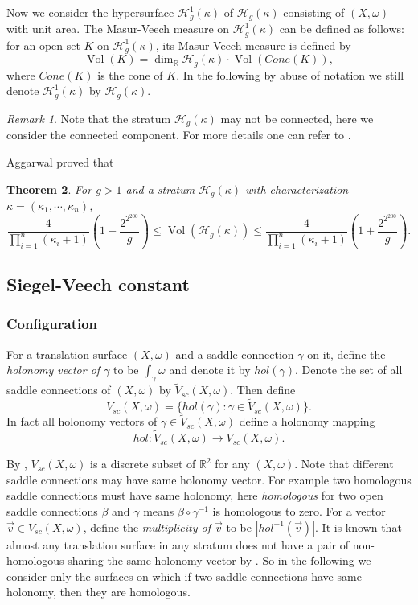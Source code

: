 \documentclass[12pt]{amsart} %
\newtheorem{theorem}{Theorem}[section]
\theoremstyle{definition}
\theoremstyle{remark}
\newtheorem{remark}[theorem]{Remark}
\numberwithin{equation}{section}
\renewcommand\H{{\mathcal H}}
\newcommand{\V}{\operatorname{Vol}}
\begin{document}
Now we consider the hypersurface $\H^1_g(\kappa)$ of $\H_g(\kappa)$ consisting of $(X,\omega)$ with unit area.
The Masur-Veech measure on $\H^1_g(\kappa)$ can be defined as follows:
for an open set $K$ on $\H^1_g(\kappa)$, its Masur-Veech measure is defined by  
$$\V(K)=\operatorname{dim}_{\mathbb{R}}\H_g(\kappa)\cdot \V(Cone(K)),$$
where $Cone(K)$ is the cone of $K$. 
In the following by abuse of notation we still denote $\H^1_g(\kappa)$ by $\H_g(\kappa)$.

\begin{remark}
Note that the stratum $\H_g(\kappa)$ may not be connected, here we consider the connected component. For more details one can refer to \cite{kontsevich2003connected}.
\end{remark}

Aggarwal \cite[Theorem 1.4]{aggarwal2020large} proved that
\begin{theorem}\label{Volume}
For $g>1$ and a stratum $\H_g(\kappa)$ with characterization $\kappa=(\kappa_1,\cdots,\kappa_n)$, 
$$\frac{4}{\prod_{i=1}^n(\kappa_i+1)}\left(1-\frac{2^{2^{200}}}{g} \right)\leq \V(\H_g(\kappa))
\leq \frac{4}{\prod_{i=1}^n(\kappa_i+1)}\left(1+\frac{2^{2^{200}}}{g} \right).$$
\end{theorem}
\subsection{Siegel-Veech constant}
\subsubsection{Configuration}
For a translation surface $(X,\omega)$ and a saddle connection $\gamma$ on it, define the \emph{holonomy vector of $\gamma$} to be $\int_\gamma\omega$ and denote it by $hol(\gamma)$.
Denote the set of all saddle connections of  $(X,\omega)$ by $\tilde{V}_{sc}(X,\omega)$.
Then define
$$V_{sc}(X,\omega)=\{hol(\gamma): \gamma\in\tilde{V}_{sc}(X,\omega)\}.$$
In fact all holonomy vectors of $\gamma \in \tilde{V}_{sc}(X,\omega)$ define a holonomy mapping
$$hol:\tilde{V}_{sc}(X,\omega)\to V_{sc}(X,\omega).$$

By \cite[Proposition 3.1]{vorobets1996planar}, $V_{sc}(X,\omega)$ is a discrete subset of $\mathbb{R}^2$ for any $(X,\omega)$.
Note that different saddle connections may have same holonomy vector.
For example two homologous saddle connections must have same holonomy, 
here \emph{homologous} for two open saddle connections $\beta$ and $\gamma$ means $\beta \circ \gamma^{-1}$ is homologous to zero.
For a vector $\vec{v}\in V_{sc}(X,\omega)$, define the \emph{multiplicity of $\vec{v}$} to be $|hol^{-1}(\vec{v})|$.
It is known that almost any translation surface in any stratum does not have a pair of non-homologous sharing the same holonomy vector 
by \cite[Proposition 3.1]{eskin2003moduli}. So in the following we consider only the surfaces on which if two saddle connections have same holonomy, 
then they are homologous.
\end{document}
